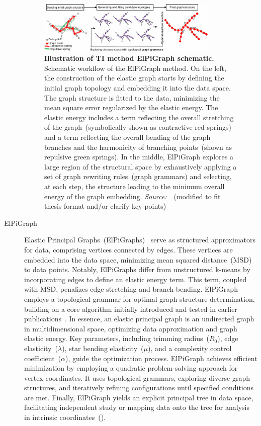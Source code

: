 \begin{description}
\begin{figure}[h!]
  	\centering
  	\includegraphics[width=0.85\textwidth]{TI_Alg_ElPiGraph/fig}
  	\vspace{0.1cm}
  	\caption[Illustration of TI method ElPiGraph schematic.]{\textbf{Illustration of TI method ElPiGraph schematic.} Schematic workflow of the ElPiGraph method. On the left, the construction of the elastic graph starts by defining the initial graph topology and embedding it into the data space. The graph structure is fitted to the data, minimizing the mean square error regularized by the elastic energy. The elastic energy includes a term reflecting the overall stretching of the graph~(symbolically shown as contractive red springs) and a term reflecting the overall bending of the graph branches and the harmonicity of branching points~(shown as repulsive green springs). In the middle, ElPiGraph explores a large region of the structural space by exhaustively applying a set of graph rewriting rules~(graph grammars) and selecting, at each step, the structure leading to the minimum overall energy of the graph embedding. \emph{Source:~\cite{cao2019monocle3}}~(modified to fit thesis format and/or clarify key points)
  	}
  	\label{fig:TI_Alg_ElPiGraph}
\end{figure}

  \item[ElPiGraph]
  Elastic Principal Graphs~(ElPiGraphs)~\citep{albergante2020ElPiGraph} serve as structured approximators for data, comprising vertices connected by edges. These vertices are embedded into the data space, minimizing mean squared distance~(MSD) to data points. Notably, ElPiGraphs differ from unstructured k-means by incorporating edges to define an elastic energy term. This term, coupled with MSD, penalizes edge stretching and branch bending. ElPiGraph employs a topological grammar for optimal graph structure determination, building on a core algorithm initially introduced and tested in earlier publications~\citep{gorban2007topological}. In essence, an elastic principal graph is an undirected graph in multidimensional space, optimizing data approximation and graph elastic energy. Key parameters, including trimming radius~($R_0$), edge elasticity~($\lambda$), star bending elasticity~($\mu$), and a complexity control coefficient~($\alpha$), guide the optimization process. ElPiGraph achieves efficient minimization by employing a quadratic problem-solving approach for vertex coordinates. It uses topological grammars, exploring diverse graph structures, and iteratively refining configurations until specified conditions are met. Finally, ElPiGraph yields an explicit principal tree in data space, facilitating independent study or mapping data onto the tree for analysis in intrinsic coordinates~().



\end{description}
